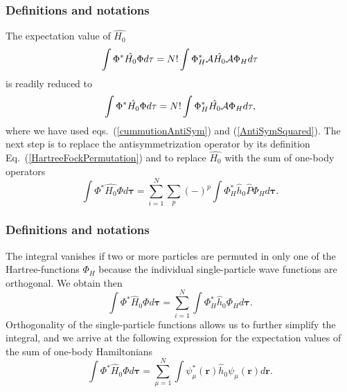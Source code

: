 \frame
{
  \frametitle{Definitions and notations}
\begin{small}
{\scriptsize
The expectation value of $\hat{H_0}$ 
\[
  \int \Phi^*\hat{H_0}\Phi d\mathbf{\tau} 
  = N! \int \Phi_H^*{\cal A}\hat{H_0}{\cal A}\Phi_H d\mathbf{\tau}
\]
is readily reduced to
\[
  \int \Phi^*\hat{H_0}\Phi d\mathbf{\tau} 
  = N! \int \Phi_H^*\hat{H_0}{\cal A}\Phi_H d\mathbf{\tau},
\]
where we have used eqs.~(\ref{cummutionAntiSym}) and
(\ref{AntiSymSquared}). The next step is to replace the antisymmetrization
operator by its definition Eq.~(\ref{HartreeFockPermutation}) and to
replace $\hat{H_0}$ with the sum of one-body operators
\[
  \int \Phi^*\hat{H_0}\Phi  d\mathbf{\tau}
  = \sum_{i=1}^N \sum_{p} (-)^p\int 
  \Phi_H^*\hat{h}_0\hat{P}\Phi_H d\mathbf{\tau}.
\]

}
\end{small}
}

\frame
{
  \frametitle{Definitions and notations}
\begin{small}
{\scriptsize
The integral vanishes if two or more particles are permuted in only one
of the Hartree-functions $\Phi_H$ because the individual single-particle wave functions are
orthogonal. We obtain then
\[
  \int \Phi^*\hat{H}_0\Phi  d\mathbf{\tau}= \sum_{i=1}^N \int \Phi_H^*\hat{h}_0\Phi_H  d\mathbf{\tau}.
\]
Orthogonality of the single-particle functions allows us to further simplify the integral, and we
arrive at the following expression for the expectation values of the
sum of one-body Hamiltonians 
\begin{equation}
  \int \Phi^*\hat{H}_0\Phi  d\mathbf{\tau}
  = \sum_{\mu=1}^N \int \psi_{\mu}^*(\mathbf{r})\hat{h}_0\psi_{\mu}(\mathbf{r})
  d\mathbf{r}.
  \label{H1Expectation}
\end{equation}

}
\end{small}
}

